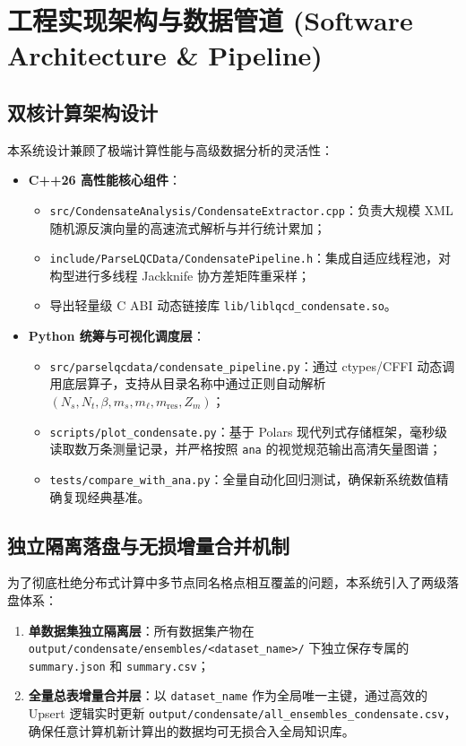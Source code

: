 \documentclass[11pt,a4paper]{ctexart}
\begin{document}
\section{工程实现架构与数据管道 (Software Architecture \& Pipeline)}


\subsection{双核计算架构设计}

本系统设计兼顾了极端计算性能与高级数据分析的灵活性：
\begin{itemize}
    \item \textbf{C++26 高性能核心组件}：
    \begin{itemize}
        \item \texttt{src/CondensateAnalysis/CondensateExtractor.cpp}：负责大规模 XML 随机源反演向量的高速流式解析与并行统计累加；
        \item \texttt{include/ParseLQCData/CondensatePipeline.h}：集成自适应线程池，对构型进行多线程 Jackknife 协方差矩阵重采样；
        \item 导出轻量级 C ABI 动态链接库 \texttt{lib/liblqcd\_condensate.so}。
    \end{itemize}
    \item \textbf{Python 统筹与可视化调度层}：
    \begin{itemize}
        \item \texttt{src/parselqcdata/condensate\_pipeline.py}：通过 ctypes/CFFI 动态调用底层算子，支持从目录名称中通过正则自动解析 $(N_s, N_t, \beta, m_s, m_\ell, m_{\text{res}}, Z_m)$；
        \item \texttt{scripts/plot\_condensate.py}：基于 Polars 现代列式存储框架，毫秒级读取数万条测量记录，并严格按照 \texttt{ana} 的视觉规范输出高清矢量图谱；
        \item \texttt{tests/compare\_with\_ana.py}：全量自动化回归测试，确保新系统数值精确复现经典基准。
    \end{itemize}
\end{itemize}

\subsection{独立隔离落盘与无损增量合并机制}

为了彻底杜绝分布式计算中多节点同名格点相互覆盖的问题，本系统引入了两级落盘体系：
\begin{enumerate}
    \item \textbf{单数据集独立隔离层}：所有数据集产物在 \texttt{output/condensate/ensembles/<dataset\_name>/} 下独立保存专属的 \texttt{summary.json} 和 \texttt{summary.csv}；
    \item \textbf{全量总表增量合并层}：以 \texttt{dataset\_name} 作为全局唯一主键，通过高效的 Upsert 逻辑实时更新 \texttt{output/condensate/all\_ensembles\_condensate.csv}，确保任意计算机新计算出的数据均可无损合入全局知识库。
\end{enumerate}
\end{document}
